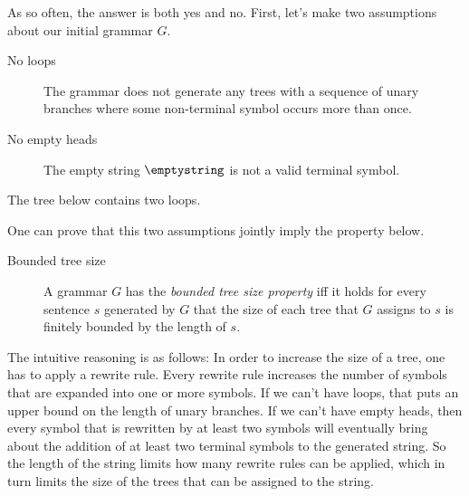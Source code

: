 As so often, the answer is both yes and no.
First, let's make two assumptions about our initial grammar $G$.
%
\begin{description}
    \item[No loops] The grammar does not generate any trees with a sequence of unary branches where some non-terminal symbol occurs more than once.
    \item[No empty heads] The empty string $\emptystring$ is not a valid terminal symbol.
\end{description}
%
\begin{examplebox}
    The tree below contains two loops.
    \begin{center}
    \end{center}
\end{examplebox}
%
One can prove that this two assumptions jointly imply the property below.
%
\begin{description}
    \item[Bounded tree size] A grammar $G$ has the \emph{bounded tree size property} iff it holds for every sentence $s$ generated by $G$ that the size of each tree that $G$ assigns to $s$ is finitely bounded by the length of $s$.
\end{description}
%
The intuitive reasoning is as follows:
In order to increase the size of a tree, one has to apply a rewrite rule.
Every rewrite rule increases the number of symbols that are expanded into one or more symbols.
If we can't have loops, that puts an upper bound on the length of unary branches.
If we can't have empty heads, then every symbol that is rewritten by at least two symbols will eventually bring about the addition of at least two terminal symbols to the generated string.
So the length of the string limits how many rewrite rules can be applied, which in turn limits the size of the trees that can be assigned to the string.

